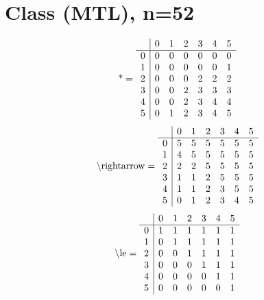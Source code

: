 \documentclass[11pt]{article}
\begin{document}
\section{Class (MTL), n=52}
\[\text{*} = 
\begin{array}{r | r r r r r r}
 & 0 & 1 & 2 & 3 & 4 & 5 \\ \hline
0 & 0 & 0 & 0 & 0 & 0 & 0 \\
1 & 0 & 0 & 0 & 0 & 0 & 1 \\
2 & 0 & 0 & 0 & 2 & 2 & 2 \\
3 & 0 & 0 & 2 & 3 & 3 & 3 \\
4 & 0 & 0 & 2 & 3 & 4 & 4 \\
5 & 0 & 1 & 2 & 3 & 4 & 5 \\
\end{array}
\]
\[\text{\textbackslash rightarrow} = 
\begin{array}{r | r r r r r r}
 & 0 & 1 & 2 & 3 & 4 & 5 \\ \hline
0 & 5 & 5 & 5 & 5 & 5 & 5 \\
1 & 4 & 5 & 5 & 5 & 5 & 5 \\
2 & 2 & 2 & 5 & 5 & 5 & 5 \\
3 & 1 & 1 & 2 & 5 & 5 & 5 \\
4 & 1 & 1 & 2 & 3 & 5 & 5 \\
5 & 0 & 1 & 2 & 3 & 4 & 5 \\
\end{array}
\]
\[\text{\textbackslash le} = 
\begin{array}{r | r r r r r r}
 & 0 & 1 & 2 & 3 & 4 & 5 \\ \hline
0 & 1 & 1 & 1 & 1 & 1 & 1 \\
1 & 0 & 1 & 1 & 1 & 1 & 1 \\
2 & 0 & 0 & 1 & 1 & 1 & 1 \\
3 & 0 & 0 & 0 & 1 & 1 & 1 \\
4 & 0 & 0 & 0 & 0 & 1 & 1 \\
5 & 0 & 0 & 0 & 0 & 0 & 1 \\
\end{array}
\]
\end{document}
